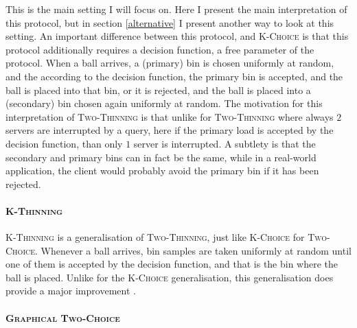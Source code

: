 This is the main setting I will focus on. Here I present the main interpretation of this protocol, but in section \ref{alternative} I present another way to look at this setting. An important difference between this protocol, and \textsc{K-Choice} is that this protocol additionally requires a decision function, a free parameter of the protocol. When a ball arrives, a (primary) bin is chosen uniformly at random, and the according to the decision function, the primary bin is accepted, and the ball is placed into that bin, or it is rejected, and the ball is placed into a (secondary) bin chosen again uniformly at random. The motivation for this interpretation of \textsc{Two-Thinning} is that unlike for \textsc{Two-Thinning} where always $2$ servers are interrupted by a query, here if the primary load is accepted by the decision function, than only $1$ server is interrupted. A subtlety is that the secondary and primary bins can in fact be the same, while in a real-world application, the client would probably avoid the primary bin if it has been rejected.

\paragraph{\textsc{K-Thinning}}

\textsc{K-Thinning} is a generalisation of \textsc{Two-Thinning}, just like \textsc{K-Choice} for \textsc{Two-Choice}. Whenever a ball arrives,  bin samples are taken uniformly at random until one of them is accepted by the decision function, and that is the bin where the ball is placed. Unlike for the \textsc{K-Choice} generalisation, this generalisation does provide a major improvement \cite{feldheim2020dthinning}.


\paragraph{\textsc{Graphical Two-Choice}}

